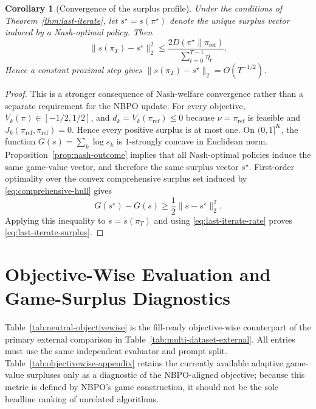 \documentclass{article}
\newtheorem{corollary}{Corollary}
\theoremstyle{remark}
\theoremstyle{plain}
\newcommand{\piref}{\pi_{\mathrm{ref}}}
\begin{document}
\begin{corollary}[Convergence of the surplus profile]
\label{cor:surplus-convergence}
Under the conditions of Theorem~\ref{thm:last-iterate}, let
$s^\star=s(\pi^\star)$ denote the unique surplus vector induced by a
Nash-optimal policy. Then
\begin{equation}
\|s(\pi_T)-s^\star\|_2^2
\le
\frac{2D(\pi^\star\|\piref)}
{\sum_{t=0}^{T-1}\eta_t}.
\label{eq:last-iterate-surplus}
\end{equation}
Hence a constant proximal step gives
$\|s(\pi_T)-s^\star\|_2=O(T^{-1/2})$.
\end{corollary}

\begin{proof}
This is a stronger consequence of Nash-welfare convergence rather than a
separate requirement for the NBPO update. For every objective,
$V_k(\pi)\in[-1/2,1/2]$, and
$d_k=V_k(\piref)\le0$ because $\nu=\piref$ is feasible and
$J_k(\piref,\piref)=0$. Hence every positive surplus is at most one. On
$(0,1]^K$, the function
$G(s)=\sum_k\log s_k$ is $1$-strongly concave in Euclidean norm.
Proposition~\ref{prop:nash-outcome} implies that all Nash-optimal policies induce the
same game-value vector, and therefore the same surplus vector $s^\star$.
First-order optimality over the convex comprehensive surplus set induced by
\eqref{eq:comprehensive-hull} gives
\begin{equation}
G(s^\star)-G(s)
\ge
\frac12\|s-s^\star\|_2^2.
\label{eq:surplus-strong-concavity}
\end{equation}
Applying this inequality to $s=s(\pi_T)$ and using
\eqref{eq:last-iterate-rate} proves \eqref{eq:last-iterate-surplus}.
\end{proof}

\section{Objective-Wise Evaluation and Game-Surplus Diagnostics}
\label{app:objectivewise}
Table~\ref{tab:neutral-objectivewise} is the fill-ready objective-wise counterpart of the primary external comparison in Table~\ref{tab:multi-dataset-external}. All entries must use the same independent evaluator and prompt split. Table~\ref{tab:objectivewise-appendix} retains the currently available adaptive game-value surpluses only as a diagnostic of the NBPO-aligned objective; because this metric is defined by NBPO's game construction, it should not be the sole headline ranking of unrelated algorithms.
\end{document}
